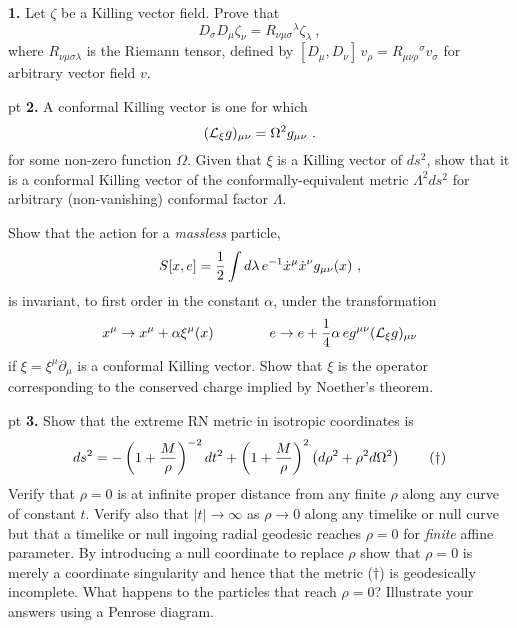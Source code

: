 \noindent
{\bf 1.} Let $\zeta$ be a Killing vector field. Prove that
$$
D_\sigma D_\mu \zeta_\nu = R_{\nu\mu\sigma}{}^\lambda \zeta_\lambda\ ,
$$
where $R_{\nu\mu\sigma\lambda}$ is the Riemann tensor, defined by
$[D_\mu,D_\nu]\, v_\rho = R_{\mu\nu\rho}{}^\sigma v_\sigma$ for
arbitrary vector field $v$.

 pt
\noindent
{\bf 2.}  A conformal Killing vector is one for which  
$$
({\cal L}_\xi g)_{\mu\nu} = \Omega^2 g_{\mu\nu}\ .
$$
for some non-zero function $\Omega$.
Given that $\xi$ is a Killing vector of $ds^2$, show that it is a
conformal Killing vector of the conformally-equivalent
metric $\Lambda^2 ds^2$ for arbitrary (non-vanishing) conformal factor
$\Lambda$.
 
Show that the action for a {\it massless} particle,
$$ S[x,e]={1\over2}\int d\lambda\, e^{-1}\dot x^\mu\dot x^\nu
g_{\mu\nu}(x)\ , $$ is invariant, to first order in the constant
$\alpha$, under the transformation 
$$
x^\mu \rightarrow x^\mu + \alpha \xi^\mu(x) \qquad \qquad
e \rightarrow e + {1\over4}\alpha\, e g^{\mu\nu}({\cal L}_\xi
g)_{\mu\nu}
$$
if $\xi =\xi^\mu \partial_\mu$ is a conformal Killing vector. Show
that $\xi$ is the operator corresponding to the conserved charge
implied by Noether's theorem.



 pt
\noindent
{\bf 3.} Show that the extreme RN metric in isotropic coordinates is
$$
ds^2 = -\left(1+{M\over\rho}\right)^{-2}dt^2 + 
\left(1+{M\over\rho}\right)^{2}\left(d\rho^2 + \rho^2 d\Omega^2\right)
\qquad (\dagger)
$$
Verify that $\rho=0$ is at infinite proper distance from any finite
$\rho$ along any curve of constant $t$. Verify also that
$|t|\rightarrow \infty$ as $\rho\rightarrow 0$ along any timelike or
null curve but that a timelike or null ingoing radial geodesic reaches
$\rho=0$ for {\it finite} affine parameter. By introducing a null
coordinate to replace $\rho$ show that $\rho=0$ is merely a coordinate
singularity and hence that the metric ($\dagger$) is geodesically
incomplete. What happens to the particles that reach $\rho=0$?
Illustrate your answers using a Penrose diagram.

